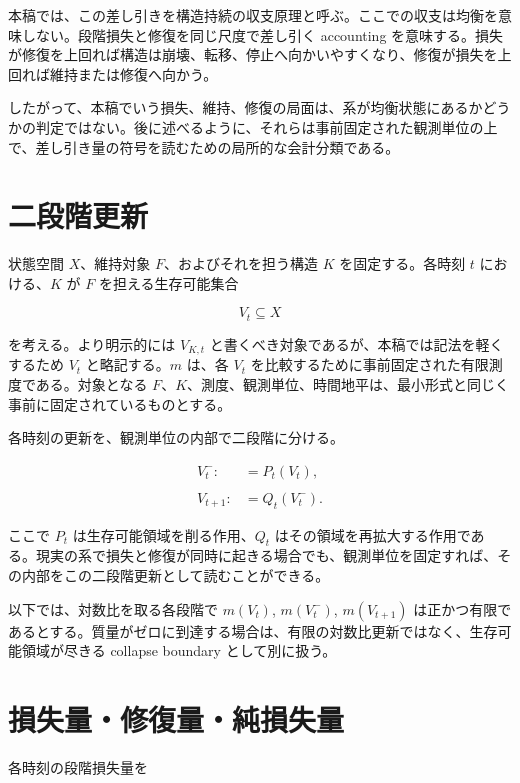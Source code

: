 \documentclass[12pt,a4paper]{article}
\begin{document}
本稿では、この差し引きを構造持続の収支原理と呼ぶ。ここでの収支は均衡を意味しない。段階損失と修復を同じ尺度で差し引く accounting を意味する。損失が修復を上回れば構造は崩壊、転移、停止へ向かいやすくなり、修復が損失を上回れば維持または修復へ向かう。

したがって、本稿でいう損失、維持、修復の局面は、系が均衡状態にあるかどうかの判定ではない。後に述べるように、それらは事前固定された観測単位の上で、差し引き量の符号を読むための局所的な会計分類である。

\section{二段階更新}\label{ux4e8cux6bb5ux968eux66f4ux65b0}

状態空間 \(X\)、維持対象 \(F\)、およびそれを担う構造 \(K\) を固定する。各時刻 \(t\) における、\(K\) が \(F\) を担える生存可能集合

\[
V_{t} \subseteq X
\]

を考える。より明示的には \(V_{K,t}\) と書くべき対象であるが、本稿では記法を軽くするため \(V_t\) と略記する。\(m\) は、各 \(V_{t}\) を比較するために事前固定された有限測度である。対象となる \(F\)、\(K\)、測度、観測単位、時間地平は、最小形式と同じく事前に固定されているものとする。

各時刻の更新を、観測単位の内部で二段階に分ける。

\[
\begin{aligned}
V_{t}^- :&= P_{t}(V_{t}), \\
\qquad \\
V_{t+1} :&= Q_{t}(V_{t}^-).
\end{aligned}
\]

ここで \(P_{t}\) は生存可能領域を削る作用、\(Q_{t}\) はその領域を再拡大する作用である。現実の系で損失と修復が同時に起きる場合でも、観測単位を固定すれば、その内部をこの二段階更新として読むことができる。

以下では、対数比を取る各段階で \(m(V_{t})\), \(m(V_{t}^-)\), \(m(V_{t+1})\) は正かつ有限であるとする。質量がゼロに到達する場合は、有限の対数比更新ではなく、生存可能領域が尽きる collapse boundary として別に扱う。

\section{損失量・修復量・純損失量}\label{ux640dux5931ux91cfux4feeux5fa9ux91cfux7d14ux640dux5931ux91cf}

各時刻の段階損失量を
\end{document}
